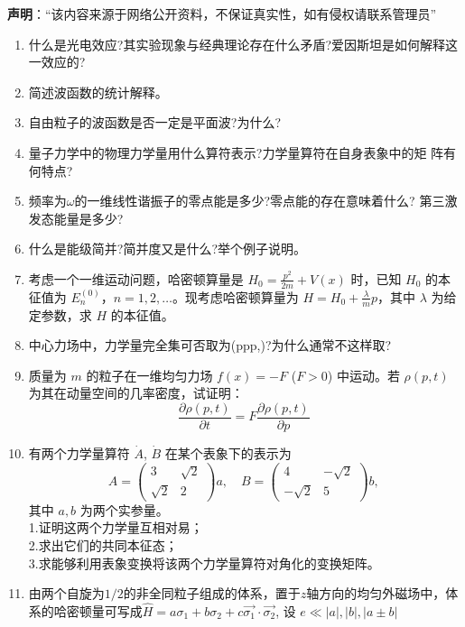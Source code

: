 
\textbf{声明}：“该内容来源于网络公开资料，不保证真实性，如有侵权请联系管理员”


\begin{enumerate}
\item 什么是光电效应?其实验现象与经典理论存在什么矛盾?爱因斯坦是如何解释这一效应的?
\item 简述波函数的统计解释。
\item 自由粒子的波函数是否一定是平面波?为什么?
\item 量子力学中的物理力学量用什么算符表示?力学量算符在自身表象中的矩
阵有何特点?
\item 频率为$\omega$的一维线性谐振子的零点能是多少?零点能的存在意味着什么?
第三激发态能量是多少?
\item 什么是能级简并?简并度又是什么?举个例子说明。
\item 考虑一个一维运动问题，哈密顿算量是 $H_0 = \frac{p^2}{2m} + V(x)$ 时，已知 $H_0$ 的本征值为 $E_n^{(0)}$，$n = 1, 2, \dots$。现考虑哈密顿算量为 $H = H_0 + \frac{\lambda}{m} p$，其中 $\lambda$ 为给定参数，求 $H$ 的本征值。
\item 中心力场中，力学量完全集可否取为(ppp,)?为什么通常不这样取?
\item 质量为 $m$ 的粒子在一维均匀力场 $f(x) = -F$ ($F > 0$) 中运动。若 $\rho(p, t)$ 为其在动量空间的几率密度，试证明：
$$\frac{\partial \rho(p, t)}{\partial t} = F \frac{\partial \rho(p, t)}{\partial p}~$$
\item 有两个力学量算符 $\dot A$, $\dot B$ 在某个表象下的表示为
$$A = \begin{pmatrix}3 & \sqrt{2} \\\sqrt{2} & 2\end{pmatrix} a, \quad B = \begin{pmatrix}4 & -\sqrt{2} \\-\sqrt{2} & 5\end{pmatrix} b,~$$
其中 $a, b$ 为两个实参量。\\
1.证明这两个力学量互相对易；\\
2.求出它们的共同本征态；\\
3.求能够利用表象变换将该两个力学量算符对角化的变换矩阵。\\
\item 由两个自旋为$1/2$的非全同粒子组成的体系，置于$z$轴方向的均匀外磁场中，体系的哈密顿量可写成$\hat{H} = a\sigma_1 + b\sigma_2 + c\vec{\sigma_1} \cdot \vec{\sigma_2}$, 设 $e \ll |a|, |b|, |a \pm b|$


\end{enumerate}
